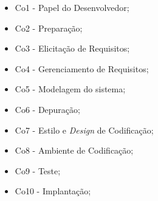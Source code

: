 \begin{itemize}
\item Co1 - Papel do Desenvolvedor;
\item Co2 - Preparação;
\item Co3 - Elicitação de Requisitos;
\item Co4 - Gerenciamento de Requisitos;
\item Co5 - Modelagem do sistema;
\item Co6 - Depuração;
\item Co7 - Estilo e \textit{Design} de Codificação;
\item Co8 - Ambiente de Codificação;
\item Co9 - Teste;
\item Co10 - Implantação;
\end{itemize}

